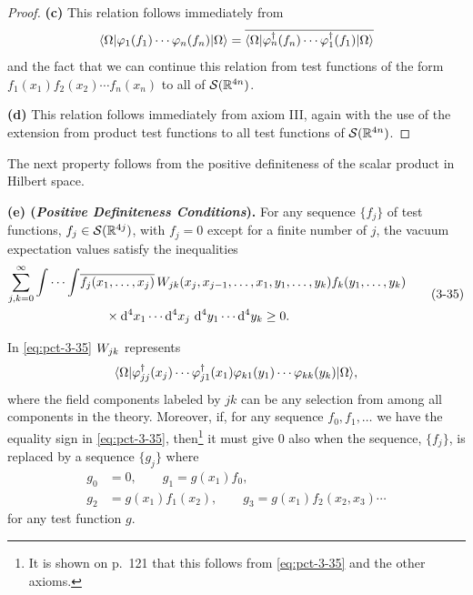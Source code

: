 \begin{proof}
\textbf{(c)} This relation follows immediately from
\begin{equation*}
 \langle \Omega\rvert\varphi_1(f_1)\cdots\varphi_n(f_n)\lvert \Omega\rangle
 =\overline{\langle \Omega\rvert\varphi_n^\dagger(f_n)\cdots
 \varphi_1^\dagger(f_1)\lvert \Omega\rangle}
\end{equation*}
and the fact that we can continue this relation from test functions of the
form $f_1(x_1)\allowbreak f_2(x_2)\allowbreak\cdots\allowbreak f_n(x_n)$ to
all of $\mathcal{S}(\mathbb{R}^{4n})$.

\textbf{(d)} This relation follows immediately from axiom III, again with the
use of the extension from product test functions to all test functions of
$\mathcal{S}(\mathbb{R}^{4n})$.
\end{proof}

The next property follows from the positive definiteness of the scalar
product in Hilbert space.

\begin{theorem}\label{thm:ch3-3-positive-definiteness}
\textbf{(e) (\emph{Positive Definiteness Conditions}).} For any sequence
$\{f_j\}$ of test functions, $f_j\in\mathcal{S}(\mathbb{R}^{4j})$, with $f_j=0$
except for a finite number of $j$, the vacuum expectation values satisfy the
inequalities
\begin{equation}
 \begin{aligned}
 \sum_{j,k=0}^{\infty}\int\cdots\int
 &\overline{f_j(x_1,\ldots,x_j)}\,
 W_{jk}(x_j,x_{j-1},\ldots,x_1,y_1,\ldots,y_k)
 f_k(y_1,\ldots,y_k)\\
 &\qquad\times\mathop{}\!\mathrm{d}^4x_1\cdots\mathop{}\!\mathrm{d}^4x_j\,\mathop{}\!\mathrm{d}^4y_1\cdots\mathop{}\!\mathrm{d}^4y_k\geq0.
 \end{aligned}
 \tag{3-35}\label{eq:pct-3-35}
\end{equation}

In \eqref{eq:pct-3-35} $W_{jk}$ represents
\begin{equation*}
 \langle \Omega\rvert\varphi_{jj}^{\dagger}(x_j)\cdots
 \varphi_{j1}^{\dagger}(x_1)\varphi_{k1}(y_1)\cdots
 \varphi_{kk}(y_k)\lvert \Omega\rangle,
\end{equation*}
where the field components labeled by $jk$ can be any selection from among
all components in the theory. Moreover, if, for any sequence
$f_0,f_1,\ldots$ we have the equality sign in \eqref{eq:pct-3-35}, then\footnote{It is
shown on p.~121 that this follows from \eqref{eq:pct-3-35} and the other axioms.} it must
give 0 also when the sequence, $\{f_j\}$, is replaced by a sequence
$\{g_j\}$ where
\begin{equation}
 \begin{aligned}
  g_0&=0,\qquad g_1=g(x_1)f_0,\\
  g_2&=g(x_1)f_1(x_2),\qquad
  g_3=g(x_1)f_2(x_2,x_3)\cdots
 \end{aligned}
\tag{3-36}\label{eq:pct-3-36}
\end{equation}
for any test function $g$.
\end{theorem}

